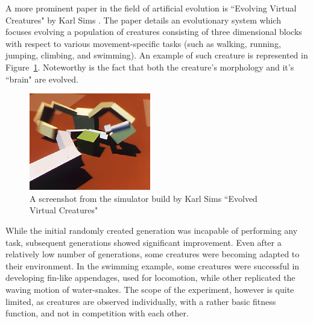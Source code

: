 A more prominent paper in the field of artificial evolution is ``Evolving Virtual Creatures" by Karl Sims \cite{sims1994evolving}. The paper details an evolutionary system which focuses evolving a population of creatures consisting of three dimensional blocks with respect to various movement-specific tasks (such as walking, running, jumping, climbing, and swimming). An example of such creature is represented in Figure~\ref{fig:evc}. Noteworthy is the fact that both the creature's morphology and it's ``brain" are evolved.
\begin{figure}[!th]
	\centering
	\includegraphics[scale=1]{images/crabvsarm}
	\caption{\label{fig:evc}A screenshot from the simulator build by Karl Sims ``Evolved Virtual Creatures"}
\end{figure}
While the initial randomly created generation was incapable of performing any task, subsequent generations showed significant improvement. Even after a relatively low number of generations, some creatures were becoming adapted to their environment. In the swimming example, some creatures were successful in developing fin-like appendages, used for locomotion, while other replicated the waving motion of water-snakes. The scope of the experiment, however is quite limited, as creatures are observed individually, with a rather basic fitness function, and not in competition with each other.

